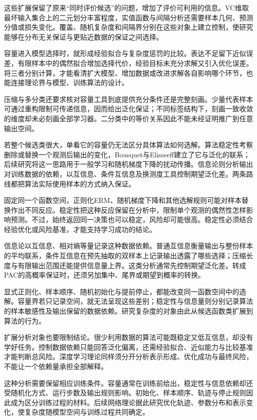 这些扩展保留了原来“同时评价候选”的问题，增加了评价可利用的信息。VC维取最坏输入集合上的二元划分丰富程度，实值函数与间隔分析还需要样本几何、预测分值或损失变化。覆盖、随机复杂度和间隔界分别在这些对象上建立控制，使研究能够在分布无关保证与更贴近数据的保证之间选择。

容量进入模型选择时，就形成经验拟合与复杂度惩罚的比较。表达不足留下近似误差，有限样本中的偶然拟合增加选择代价，经验目标未充分求解又引入优化误差。将三者分别计算，才能看清扩大模型、增加数据或改进求解各自影响哪个环节，也能连接理论界与模型、训练算法的设计。

压缩与多分类还要求核对容量工具到底提供充分条件还是完整刻画。少量代表样本可通过重构限制可传递信息，因而给出泛化保证；不同标签结构下，刻画一致收敛的维度却未必刻画全部学习器。二分类中的等价关系因此不能未经证明推广到任意输出空间。

若整个候选类很大，单看它的容量仍无法区分具体算法如何选解。算法稳定性考察删除或替换一个观测后输出的变化，Bousquet与Elisseeff建立了它与泛化的联系；后续研究将这一思路用于一般学习和随机梯度下降的扰动传播。信息论则分析输出对训练数据的依赖，以互信息、条件互信息及换测度工具控制期望泛化差。两条路线都把算法实际使用样本的方式纳入保证。

固定同一个函数空间，正则化ERM、随机梯度下降和其他选解规则可能对样本替换作出不同反应。稳定性把这种反应保留在分析中，限制单个观测的偶然性怎样影响预测。不过，始终返回同一决策也可以稳定，风险却可能很高。稳定性必须结合经验优化或风险基准，才能支持学习成功的结论。

信息论以互信息、相对熵等量记录这种数据依赖。普通互信息衡量输出与整份样本的平均联系，条件互信息在预先抽取的双样本上记录输出透露了哪些选择；压缩长度与有限输出范围还能提供信息量上界。这类分析通常先控制期望泛化差。转成PAC的高概率保证时，还须另加集中、尾界或期望到概率的转换。

显式正则化、样本顺序、随机初始化与提前停止，都能改变同一函数空间中的选解。容量界若只记录空间，就无法呈现这些差别；稳定性与信息量则分别记录算法的样本敏感性及输出保留的数据依赖。研究复杂度的对象由此从候选函数类扩展到算法的行为。

扩展分析对象也要限制结论。很少利用数据的算法可能既稳定又低互信息，却没有学好任务。控制数据依赖只能回答泛化偏离，还需经验拟合、近似能力与比较基准才能判断总风险。深度学习理论同样须分开分析表示形成、优化成功与最终风险，不能让一个依赖量承担全部解释。

这种分析需要保留相应训练条件。容量通常在训练前给出，稳定性与信息依赖却还受随机化方式、运行步数及输出规则影响。初始化、样本顺序、轨迹与停止规则因此成为区分训练过程的材料。后续网络理论据此研究优化轨迹、参数分布和表示变化，使复杂度随模型空间与训练过程共同确定。

